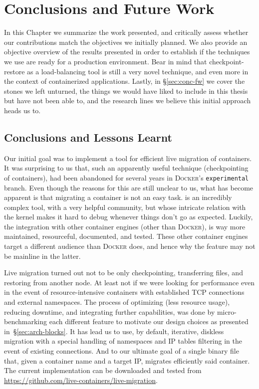 \chapter{Conclusions and Future Work} \label{chap:conclusion}

In this Chapter we summarize the work presented, and critically assess whether our contributions match the objectives we initially planned.
We also provide an objective overview of the results presented in order to establish if the techniques we use are ready for a production environment.
Bear in mind that checkpoint-restore as a load-balancing tool is still a very novel technique, and even more in the context of containerized applications.
Lastly, in \S\ref{sec:conc-fw} we cover the stones we left unturned, the things we would have liked to include in this thesis but have not been able to, and the research lines we believe this initial approach heads us to.

\section{Conclusions and Lessons Learnt}

Our initial goal was to implement a tool for efficient live migration of containers.
It was surprising to us that, such an apparently useful technique (checkpointing of containers), had been abandoned for several years in \textsc{Docker}'s \texttt{experimental} branch.
Even though the reasons for this are still unclear to us, what has become apparent is that migrating a container is not an easy task.
\criu is an incredibly complex tool, with a very helpful community, but whose intricate relation with the kernel makes it hard to debug whenever things don't go as expected.
Luckily, the integration with other container engines (other than \textsc{Docker}), is way more maintained, resourceful, documented, and tested.
These other container engines target a different audience than \textsc{Docker} does, and hence why the feature may not be mainline in the latter.

Live migration turned out not to be only checkpointing, transferring files, and restoring from another node.
At least not if we were looking for performance even in the event of resource-intensive containers with established TCP connections and external namespaces.
The process of optimizing (less resource usage), reducing downtime, and integrating further capabilities, was done by micro-benchmarking each different feature to motivate our design choices as presented in~\S\ref{sec:arch-blocks}.
It has lead us to use, by default, iterative, diskless migration with a special handling of namespaces and IP tables filtering in the event of existing connections.
And to our ultimate goal of a single binary file that, given a container name and a target IP, migrates efficiently said container.
The current implementation can be downloaded and tested from \url{https://github.com/live-containers/live-migration}.

